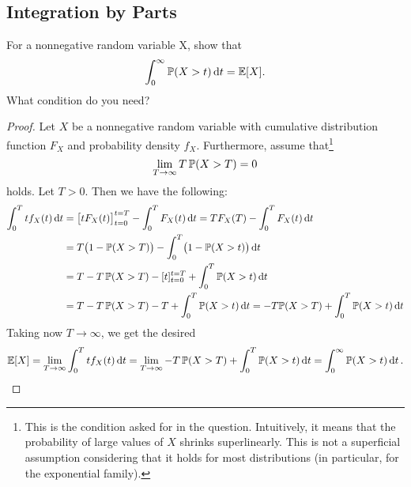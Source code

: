     \subsection{Integration by Parts}
        For a nonnegative random variable X, show that
        \begin{equation}
            \int_{0}^{\infty} \P(X > t) \dd{t} = \E[X].
        \end{equation}
        What condition do you need?

        \begin{solution}
            \begin{proof}
                Let \(X\) be a nonnegative random variable with cumulative distribution function \(F_X\) and probability density \(f_X\). Furthermore, assume that\footnote{This is the condition asked for in the question. Intuitively, it means that the probability of large values of \(X\) shrinks superlinearly. This is not a superficial assumption considering that it holds for most distributions (in particular, for the exponential family).}
                \begin{equation}
                    \lim_{T \to \infty} T \, \P(X > T) = 0
                \end{equation}
                holds. Let \(T > 0\). Then we have the following:
                \begin{align}
                    \int_{0}^{T} t f_X(t) \dd{t}
                        &= \bigl[ t F_X(t) \bigr]_{t = 0}^{t = T} - \int_{0}^{T} F_X(t) \dd{t}
                         = T F_X(T) - \int_{0}^{T} F_X(t) \dd{t} \\
                        &= T \bigl( 1 - \P(X > T) \bigr) - \int_{0}^{T} \bigl( 1 - \P(X > t) \bigr) \dd{t} \\
                        &= T - T \, \P(X > T) - [t]_{t = 0}^{t = T} + \int_{0}^{T} \P(X > t) \dd{t} \\
                        &= T - T \, \P(X > T) - T + \int_{0}^{T} \P(X > t) \dd{t}
                         = -T \P(X > T) + \int_{0}^{T} \P(X > t) \dd{t}
                \end{align}
                Taking now \(T \to \infty\), we get the desired
                \begin{equation}
                    \E[X]
                        = \lim_{T \to \infty} \int_{0}^{T} t f_X(t) \dd{t}
                        = \lim_{T \to \infty} -T \, \P(X > T) + \int_{0}^{T} \P(X > t) \dd{t}
                        = \int_{0}^{\infty} \P(X > t) \dd{t}.
                \end{equation}
            \end{proof}
        \end{solution}


